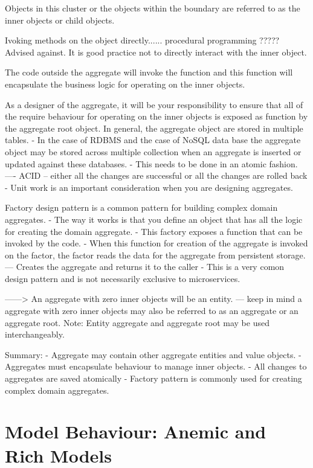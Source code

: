 Objects in this cluster or the objects within the boundary are referred to as the inner objects or child objects.

Ivoking methods on the object directly...... procedural programming ????? Advised against.
It is good practice not to directly interact with the inner object.

The code outside the aggregate will invoke the function and this function will encapsulate the business logic for operating on the inner objects.

As a designer of the aggregate, it will be your responsibility to ensure that all of the require behaviour for operating on the inner objects is exposed as function by the aggregate root object.
In general, the aggregate object are stored in multiple tables.
- In the case of RDBMS and the case of NoSQL data base the aggregate object may be stored across multiple collection when an aggregate is inserted or updated against these databases.
- This needs to be done in an atomic fashion.
---- ACID -- either all the changes are successful or all the changes are rolled back %
- Unit work is an important consideration when you are designing aggregates.

Factory design pattern is a common pattern for building complex domain aggregates.
- The way it works is that you define an object that has all the logic for creating the domain aggregate.
- This factory exposes a function that can be invoked by the code.
- When this function for creation of the aggregate is invoked on the factor, the factor reads the data for the aggregate from persistent storage.
--- Creates the aggregate and returns it to the caller
- This is a very comon design pattern and is not necessarily exclusive to microservices.

------> An aggregate with zero inner objects will be an entity.
--- keep in mind a aggregate with zero inner objects may also be referred to as an aggregate or an aggregate root.
Note: Entity aggregate and aggregate root may be used interchangeably.

Summary:
- Aggregate may contain other aggregate entities and value objects.
- Aggregates must encapsulate behaviour to manage inner objects.
- All changes to aggregates are saved atomically
- Factory pattern is commonly used for creating complex domain aggregates.

\section{Model Behaviour: Anemic and Rich Models}

